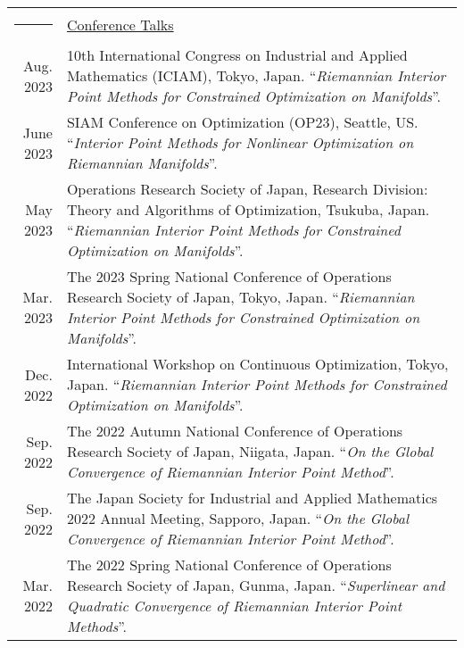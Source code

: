 \documentclass[11pt]{article}
\newcommand{\headingfont}{\LARGE \MakeUppercase }
\newenvironment{SectionTable}[1]{
	\renewcommand*{\arraystretch}{1.0}
	\setlength{\tabcolsep}{10pt}
	\begin{longtable}{Rp{5.7in}} 
		\rule{2.5cm}{4pt} 
		& \underline{#1} \\ %
	}
	{
	\end{longtable}\vspace{-.3cm}
}
\begin{document}
\begin{SectionTable}{\headingfont Conference Talks}
	Aug. 2023 & 10th International Congress on Industrial and Applied Mathematics (ICIAM), Tokyo, Japan.  \newline ``\textit{Riemannian Interior Point Methods for Constrained Optimization on Manifolds}''. \\
	
	June 2023 & SIAM Conference on Optimization (OP23), Seattle, US.  
	 \newline ``\textit{Interior Point Methods for Nonlinear Optimization on Riemannian Manifolds}''. \\
	
	May 2023 & Operations Research Society of Japan, Research Division: Theory and Algorithms of Optimization, Tsukuba, Japan.  
	 \newline ``\textit{Riemannian Interior Point Methods for Constrained Optimization on Manifolds}''. \\
	
	Mar. 2023 & The 2023 Spring National Conference of Operations Research Society of Japan, Tokyo, Japan.  
	 \newline ``\textit{Riemannian Interior Point Methods for Constrained Optimization on Manifolds}''. \\
	
	Dec. 2022 & International Workshop on Continuous Optimization, Tokyo, Japan.  
	 \newline ``\textit{Riemannian Interior Point Methods for Constrained Optimization on Manifolds}''. \\
	
	Sep. 2022 & The 2022 Autumn National Conference of Operations Research Society of Japan, Niigata, Japan. 
	 \newline ``\textit{On the Global Convergence of Riemannian Interior Point Method}''.\\
	
	Sep. 2022 & The Japan Society for Industrial and Applied Mathematics 2022 Annual Meeting, Sapporo, Japan. 
	 \newline ``\textit{On the Global Convergence of Riemannian Interior Point Method}''.\\
	
	Mar. 2022 & The 2022 Spring National Conference of Operations Research Society of Japan, Gunma, Japan.
	 \newline ``\textit{Superlinear and Quadratic Convergence of Riemannian Interior Point Methods}''. \\
	

\end{SectionTable}
\end{document}
